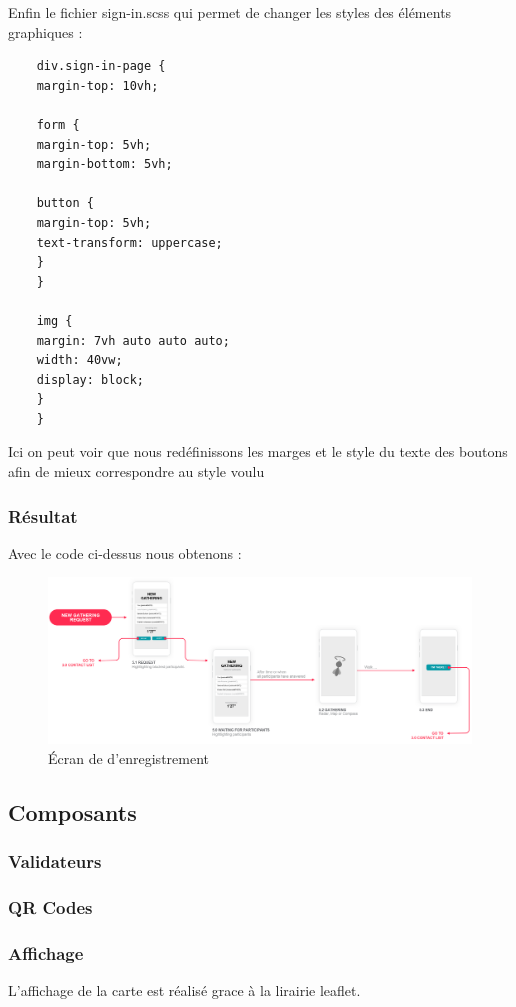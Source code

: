 \documentclass[french]{article}
\begin{document}
	Enfin le fichier sign-in.scss qui permet de changer les styles des éléments graphiques :
	
	\lstset{language = HTML5}
	
	\begin{lstlisting}
	div.sign-in-page {
	margin-top: 10vh;
	
	form {
	margin-top: 5vh;
	margin-bottom: 5vh;
	
	button {
	margin-top: 5vh;
	text-transform: uppercase;
	}
	}
	
	img {
	margin: 7vh auto auto auto;
	width: 40vw;
	display: block;
	}
	}
	\end{lstlisting}
	
	Ici on peut voir que nous redéfinissons les marges et le style du texte des boutons afin de mieux correspondre au style voulu
	
	\subsubsection{Résultat}
	
	Avec le code ci-dessus nous obtenons :
	
	\begin{figure}[H]
		\centering
		\includegraphics[scale=0.6]{../user-flow/user-flow-5.png}
		\caption{Écran de d'enregistrement}
		\label{Écran de d'enregistrement}
	\end{figure}
	
	\subsection{Composants}
	\subsubsection{Validateurs}
	\subsubsection{QR Codes}
	\subsubsection{Affichage}
	L'affichage de la carte est réalisé grace à la lirairie leaflet.
	
\end{document}
